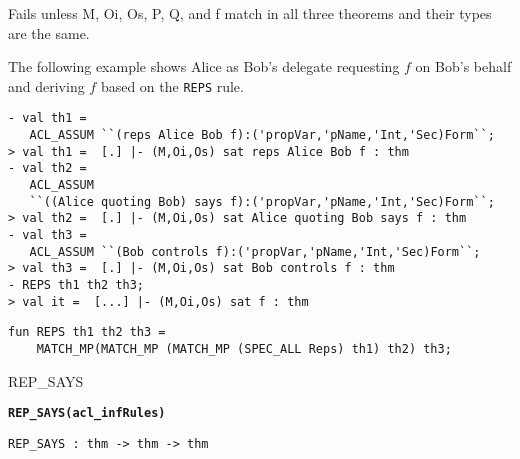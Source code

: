 \FAILURE 
Fails unless M, Oi, Os, P, Q, and f match in all three
theorems and their types are the same.  

\EXAMPLE The following example shows Alice as Bob's delegate
requesting $f$ on Bob's behalf and deriving $f$ based on the
\texttt{REPS} rule.
\begin{holboxed}
\begin{verbatim}
- val th1 = 
   ACL_ASSUM ``(reps Alice Bob f):('propVar,'pName,'Int,'Sec)Form``;
> val th1 =  [.] |- (M,Oi,Os) sat reps Alice Bob f : thm
- val th2 = 
   ACL_ASSUM 
   ``((Alice quoting Bob) says f):('propVar,'pName,'Int,'Sec)Form``;
> val th2 =  [.] |- (M,Oi,Os) sat Alice quoting Bob says f : thm
- val th3 = 
   ACL_ASSUM ``(Bob controls f):('propVar,'pName,'Int,'Sec)Form``;
> val th3 =  [.] |- (M,Oi,Os) sat Bob controls f : thm
- REPS th1 th2 th3;
> val it =  [...] |- (M,Oi,Os) sat f : thm
\end{verbatim}
\end{holboxed}

\IMPLEMENTATION
\begin{holboxed}
\begin{verbatim}
fun REPS th1 th2 th3 = 
    MATCH_MP(MATCH_MP (MATCH_MP (SPEC_ALL Reps) th1) th2) th3;
\end{verbatim}
\end{holboxed}

\SEEALSO
REP\_SAYS
\ENDDOC

\begin{holboxed}
  \begin{Large}
    \textbf{\texttt{REP\_SAYS}}\hfill{}\textbf{\texttt{(acl\_infRules)}}
  \end{Large}
\end{holboxed}

\begin{verbatim}
REP_SAYS : thm -> thm -> thm
\end{verbatim}

